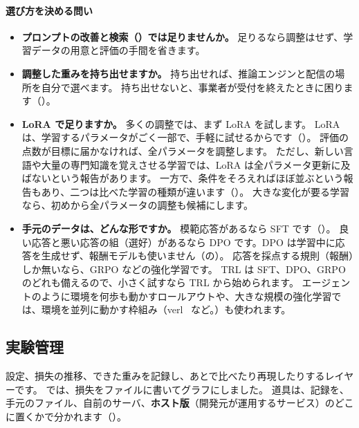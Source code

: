 \paragraph{選び方を決める問い}
\begin{itemize}[nosep,beginpenalty=10000]
\item \textbf{プロンプトの改善と検索（）では足りませんか。}
  足りるなら調整はせず、学習データの用意と評価の手間を省きます。
\item \textbf{調整した重みを持ち出せますか。}
  持ち出せれば、推論エンジンと配信の場所を自分で選べます。
  持ち出せないと、事業者が受付を終えたときに困ります（）。
\item \textbf{LoRA で足りますか。}
  多くの調整では、まず LoRA を試します。
  LoRA は、学習するパラメータがごく一部で、手軽に試せるからです（）。
  評価の点数が目標に届かなければ、全パラメータを調整します。
  ただし、新しい言語や大量の専門知識を覚えさせる学習では、LoRA は全パラメータ更新に及ばないという報告があります。
  一方で、条件をそろえればほぼ並ぶという報告もあり、二つは比べた学習の種類が違います（）。
  大きな変化が要る学習なら、初めから全パラメータの調整も候補にします。
\item \textbf{手元のデータは、どんな形ですか。}
  模範応答があるなら SFT です（）。
  良い応答と悪い応答の組（選好）があるなら DPO です。DPO は学習中に応答を生成せず、報酬モデルも使いません（の）。
  応答を採点する規則（報酬）しか無いなら、GRPO などの強化学習です。
  TRL は SFT、DPO、GRPO のどれも備えるので、小さく試すなら TRL から始められます。
  エージェントのように環境を何歩も動かすロールアウトや、大きな規模の強化学習では、環境を並列に動かす枠組み（verl~\cite{sheng2025hybridflow} など。）も使われます。
\end{itemize}

\subsection{実験管理}\label{sec:tm-track}

設定、損失の推移、できた重みを記録し、あとで比べたり再現したりするレイヤーです。
では、損失をファイルに書いてグラフにしました。
道具は、記録を、手元のファイル、自前のサーバ、\textbf{ホスト版}（開発元が運用するサービス）のどこに置くかで分かれます（）。

